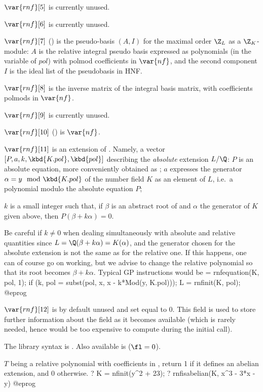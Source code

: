 $\var{rnf}[5]$ is currently unused.

$\var{rnf}[6]$ is currently unused.

$\var{rnf}[7]$ () is the pseudo-basis $(A,I)$ for the maximal
order $\Z_L$ as a $\Z_K$-module: $A$ is the relative integral pseudo basis
expressed as polynomials (in the variable of $pol$) with polmod coefficients
in $\var{nf}$, and the second component $I$ is the ideal list of the
pseudobasis in HNF.

$\var{rnf}[8]$ is the inverse matrix of the integral basis matrix, with
coefficients polmods in $\var{nf}$.

$\var{rnf}[9]$ is currently unused.

$\var{rnf}[10]$ () is $\var{nf}$.

$\var{rnf}[11]$ is an extension of . Namely, a
vector $[P, a, k, \kbd{K.pol}, \kbd{pol}]$ describing the \emph{absolute}
extension
$L/\Q$: $P$ is an absolute equation, more conveniently obtained
as ; $a$ expresses the generator $\alpha = y \mod \kbd{K.pol}$
of the number field $K$ as an element of $L$, i.e.~a polynomial modulo the
absolute equation $P$;

$k$ is a small integer such that, if $\beta$ is an abstract root of 
and $\alpha$ the generator of $K$ given above, then $P(\beta + k\alpha) = 0$.

 Be careful if $k\neq0$ when dealing simultaneously with
absolute and relative quantities since $L = \Q(\beta + k\alpha) =
K(\alpha)$, and the generator chosen for the absolute extension is not the
same as for the relative one. If this happens, one can of course go on
working, but we advise to change the relative polynomial so that its root
becomes $\beta + k \alpha$. Typical GP instructions would be
\bprog
  [P,a,k] = rnfequation(K, pol, 1);
  if (k, pol = subst(pol, x, x - k*Mod(y, K.pol)));
  L = rnfinit(K, pol);
@eprog

$\var{rnf}[12]$ is by default unused and set equal to 0. This field is used
to store further information about the field as it becomes available (which
is rarely needed, hence would be too expensive to compute during the initial
 call).

The library syntax is .
Also available is
 ($\fl = 0$).

\label{se:rnfisabelian}
$T$ being a relative polynomial with coefficients
in , return 1 if it defines an abelian extension, and 0 otherwise.
\bprog
? K = nfinit(y^2 + 23);
? rnfisabelian(K, x^3 - 3*x - y)
@eprog


